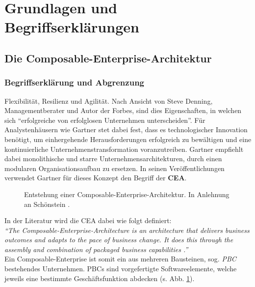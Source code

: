 \section{Grundlagen und Begriffserklärungen}

\subsection{Die Composable-Enterprise-Architektur}

\subsubsection{Begriffserklärung und Abgrenzung}
\label{sec:CEA_B}
Flexibilität, Resilienz und Agilität. Nach Ansicht von Steve Denning, Managementberater und Autor der Forbes, sind dies Eigenschaften, in welchen sich \enquote{erfolgreiche von erfolglosen Unternehmen unterscheiden}. Für Analystenhäusern wie Gartner stet dabei fest, dass es technologischer Innovation benötigt, um einhergehende Herausforderungen erfolgreich zu bewältigen und eine kontinuierliche Unternehmenstransformation voranzutreiben. Gartner empfiehlt dabei monolithische und starre Unternehmensarchitekturen, durch einen modularen Organisationsaufbau zu ersetzen. In seinen Veröffentlichungen verwendet Gartner für dieses Konzept den Begriff der \textbf{\ac{CEA}}.
\begin{center}
	\begin{figure}[H]
		\centering
		\caption[Entstehung einer Composable-Enterprise-Architektur]{Entstehung einer Composable-Enterprise-Architektur. In Anlehnung an Schönstein \cite{Schonenstein.20230103}.}
		\label{fig:CEA}
	\end{figure}	
\end{center}
\vspace*{-15mm}
In der Literatur wird die CEA dabei wie folgt definiert:\vspace{2mm}\\
\textit{\enquote{The Composable-Enterprise-Architecture is an architecture that delivers business outcomes and adapts to the pace of business change. It does this through the assembly and combination of packaged business capabilities \cite{.20230313}.}}\vspace{2mm}\\
Ein Composable-Enterprise ist somit ein aus mehreren Bausteinen, sog. \textit{\ac{PBC}} bestehendes Unternehmen. PBCs sind vorgefertigte Softwareelemente, welche jeweils eine bestimmte Geschäftsfunktion abdecken (s. Abb. \ref{fig:CEA}).
